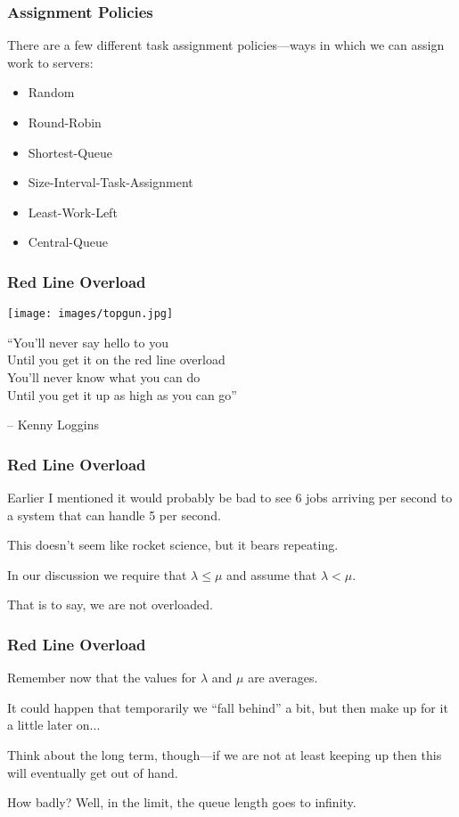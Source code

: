 \begin{frame}
\frametitle{Assignment Policies}

There are a few different task assignment policies---ways in which we can assign work to servers:

\begin{itemize}
	\item Random
	\item Round-Robin
	\item Shortest-Queue
	\item Size-Interval-Task-Assignment
	\item Least-Work-Left
	\item Central-Queue
\end{itemize}

\end{frame}


\begin{frame}
\frametitle{Red Line Overload}

\begin{center}
	\texttt{[image: images/topgun.jpg]}
\end{center}

``You'll never say hello to you\\
Until you get it on the red line overload\\
You'll never know what you can do\\
Until you get it up as high as you can go''
 
\hfill -- Kenny Loggins


\end{frame}



\begin{frame}
\frametitle{Red Line Overload}

Earlier I mentioned it would probably be bad to see 6 jobs arriving per second to a system that can handle 5 per second. 

This doesn't seem like rocket science, but it bears repeating. 

In our discussion we require that $\lambda \leq \mu$ and assume that $\lambda < \mu$. 

That is to say, we are not overloaded.

\end{frame}



\begin{frame}
\frametitle{Red Line Overload}

Remember now that the values for $\lambda$ and $\mu$ are averages. 

It could happen that temporarily we ``fall behind'' a bit, but then make up for it a little later on... 

Think about the long term, though---if we are not at least keeping up then this will eventually get out of hand. 

How badly? Well, in the limit, the queue length goes to infinity.

\end{frame}



